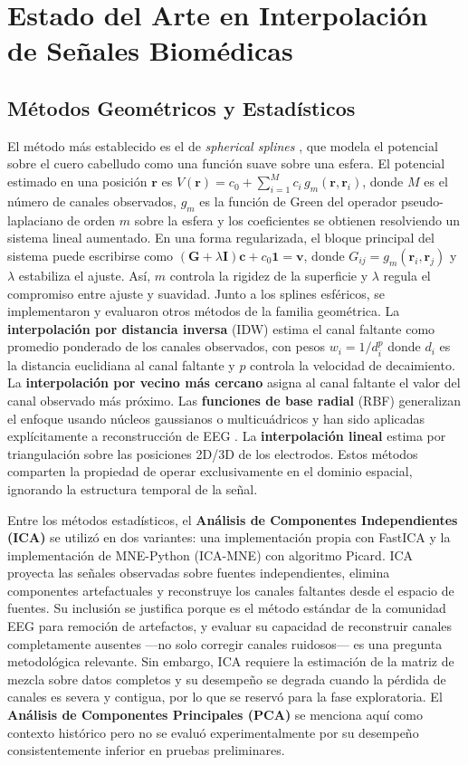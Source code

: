 \section{Estado del Arte en Interpolación de Señales Biomédicas}

\subsection{Métodos Geométricos y Estadísticos}

El método más establecido es el de \textit{spherical splines} \cite{perrin1989}, que modela el potencial sobre el cuero cabelludo como una función suave sobre una esfera. El potencial estimado en una posición $\mathbf{r}$ es $\hat{V}(\mathbf{r}) = c_0 + \sum_{i=1}^{M} c_i \, g_m(\mathbf{r}, \mathbf{r}_i)$, donde $M$ es el número de canales observados, $g_m$ es la función de Green del operador pseudo-laplaciano de orden $m$ sobre la esfera y los coeficientes se obtienen resolviendo un sistema lineal aumentado. En una forma regularizada, el bloque principal del sistema puede escribirse como $(\mathbf{G} + \lambda \mathbf{I})\mathbf{c} + c_0\mathbf{1}=\mathbf{v}$, donde $G_{ij}=g_m(\mathbf{r}_i,\mathbf{r}_j)$ y $\lambda$ estabiliza el ajuste. Así, $m$ controla la rigidez de la superficie y $\lambda$ regula el compromiso entre ajuste y suavidad.
Junto a los splines esféricos, se implementaron y evaluaron otros métodos de la familia geométrica. La \textbf{interpolación por distancia inversa} (IDW) estima el canal faltante como promedio ponderado de los canales observados, con pesos $w_i = 1/d_i^p$ donde $d_i$ es la distancia euclidiana al canal faltante y $p$ controla la velocidad de decaimiento. La \textbf{interpolación por vecino más cercano} asigna al canal faltante el valor del canal observado más próximo. Las \textbf{funciones de base radial} (RBF) generalizan el enfoque usando núcleos gaussianos o multicuádricos y han sido aplicadas explícitamente a reconstrucción de EEG \cite{jager2016rbf}. La \textbf{interpolación lineal} estima por triangulación sobre las posiciones 2D/3D de los electrodos. Estos métodos comparten la propiedad de operar exclusivamente en el dominio espacial, ignorando la estructura temporal de la señal.

Entre los métodos estadísticos, el \textbf{Análisis de Componentes Independientes (ICA)} \cite{jung2001imaging} se utilizó en dos variantes: una implementación propia con FastICA y la implementación de MNE-Python (ICA-MNE) con algoritmo Picard. ICA proyecta las señales observadas sobre fuentes independientes, elimina componentes artefactuales y reconstruye los canales faltantes desde el espacio de fuentes. Su inclusión se justifica porque es el método estándar de la comunidad EEG para remoción de artefactos, y evaluar su capacidad de reconstruir canales completamente ausentes —no solo corregir canales ruidosos— es una pregunta metodológica relevante. Sin embargo, ICA requiere la estimación de la matriz de mezcla sobre datos completos y su desempeño se degrada cuando la pérdida de canales es severa y contigua, por lo que se reservó para la fase exploratoria. El \textbf{Análisis de Componentes Principales (PCA)} se menciona aquí como contexto histórico pero no se evaluó experimentalmente por su desempeño consistentemente inferior en pruebas preliminares.
